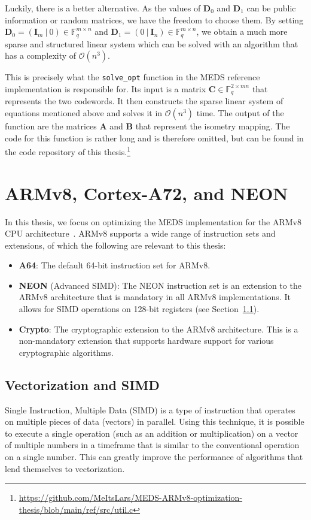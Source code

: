 \documentclass[11pt,a4paper]{report}
\theoremstyle{definition}
\begin{document}
Luckily, there is a better alternative. As the values of $\textbf{D}_0$ and $\textbf{D}_1$ can be public information or random matrices, we have the freedom to choose them. By setting $\textbf{D}_0 = (\textbf{I}_m~|~0) \in \mathbb{F}_q^{m \times n}$ and $\textbf{D}_1 = (0~|~\textbf{I}_n) \in \mathbb{F}_q^{m \times n}$, we obtain a much more sparse and structured linear system which can be solved with an algorithm that has a complexity of $\mathcal{O}(n^3)$.

This is precisely what the \texttt{solve\_opt} function in the MEDS reference implementation is responsible for. Its input is a matrix $\textbf{C} \in \mathbb{F}_q^{2 \times mn}$ that represents the two codewords. It then constructs the sparse linear system of equations mentioned above and solves it in $\mathcal{O}(n^3)$ time. The output of the function are the matrices $\textbf{A}$ and $\textbf{B}$ that represent the isometry mapping. The code for this function is rather long and is therefore omitted, but can be found in the code repository of this thesis.\footnote{\url{https://github.com/MeItsLars/MEDS-ARMv8-optimization-thesis/blob/main/ref/src/util.c}}

\section{ARMv8, Cortex-A72, and NEON}
\label{sec:armv8}
In this thesis, we focus on optimizing the MEDS implementation for the ARMv8 CPU architecture~\cite{armv8m}. ARMv8 supports a wide range of instruction sets and extensions, of which the following are relevant to this thesis:
\begin{itemize}
  \item \textbf{A64}: The default 64-bit instruction set for ARMv8.
  \item \textbf{NEON} (Advanced SIMD): The NEON instruction set is an extension to the ARMv8 architecture that is mandatory in all ARMv8 implementations. It allows for SIMD operations on 128-bit registers (see Section~\ref{sec:simd}).
  \item \textbf{Crypto}: The cryptographic extension to the ARMv8 architecture. This is a non-mandatory extension that supports hardware support for various cryptographic algorithms.
\end{itemize}

\subsection{Vectorization and SIMD}
\label{sec:simd}
Single Instruction, Multiple Data (SIMD) is a type of instruction that operates on multiple pieces of data (vectors) in parallel. Using this technique, it is possible to execute a single operation (such as an addition or multiplication) on a vector of multiple numbers in a timeframe that is similar to the conventional operation on a single number. This can greatly improve the performance of algorithms that lend themselves to vectorization.
\end{document}
